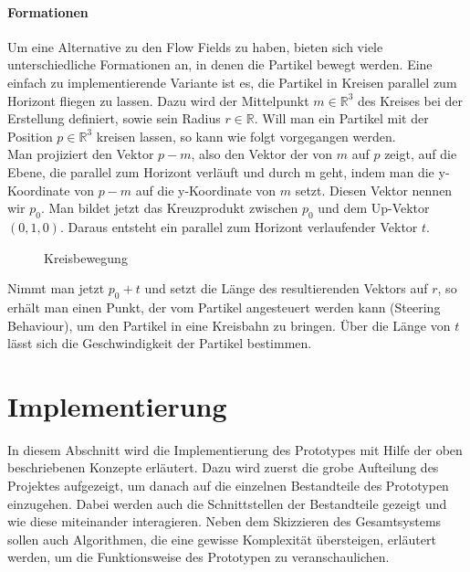 \documentclass[11pt,a4paper]{article}
\begin{document}
\paragraph{Formationen}
Um eine Alternative zu den Flow Fields zu haben, bieten sich viele unterschiedliche Formationen an, in denen die Partikel bewegt werden. Eine einfach zu implementierende Variante ist es, die Partikel in Kreisen parallel zum Horizont fliegen zu lassen. Dazu wird der Mittelpunkt $m \in \mathbb{R}^3$ des Kreises bei der Erstellung definiert, sowie sein Radius $r \in \mathbb{R}$.
Will man ein Partikel mit der Position $p \in \mathbb{R}^3$ kreisen lassen, so kann wie folgt vorgegangen werden.\\
Man projiziert den Vektor $p - m$, also den Vektor der von $m$ auf $p$ zeigt, auf die Ebene, die parallel zum Horizont verläuft und durch m geht, indem man die y-Koordinate von $p - m$ auf die y-Koordinate von $m$ setzt. Diesen Vektor nennen wir $p_0$. Man bildet jetzt das Kreuzprodukt zwischen $p_0$ und dem Up-Vektor $(0, 1, 0)$. Daraus entsteht ein parallel zum Horizont verlaufender Vektor $t$.
\begin{center}
\begin{figure}[h!]
\centering
\vspace{20pt}
\caption[Kreisbewegung]{Kreisbewegung}
\end{figure}
\end{center}
\noindent
Nimmt man jetzt $p_0+t$ und setzt die Länge des resultierenden Vektors auf $r$, so erhält man einen Punkt, der vom Partikel angesteuert werden kann (Steering Behaviour), um den Partikel in eine Kreisbahn zu bringen. Über die Länge von $t$ lässt sich die Geschwindigkeit der Partikel bestimmen.

\newpage

\section{Implementierung}
In diesem Abschnitt wird die Implementierung des Prototypes mit Hilfe der oben beschriebenen Konzepte erläutert. Dazu wird zuerst die grobe Aufteilung des Projektes aufgezeigt, um danach auf die einzelnen Bestandteile des Prototypen einzugehen. Dabei werden auch die Schnittstellen der Bestandteile gezeigt und wie diese miteinander interagieren. Neben dem Skizzieren des Gesamtsystems sollen auch Algorithmen, die eine gewisse Komplexität übersteigen, erläutert werden, um die Funktionsweise des Prototypen zu veranschaulichen.
\end{document}
